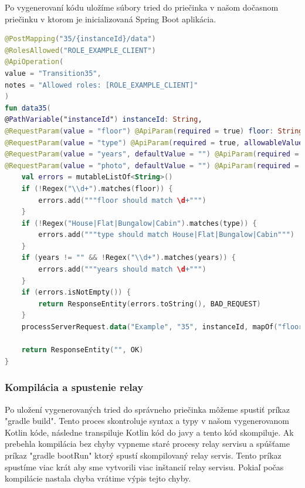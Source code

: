 Po vygenerovaní kódu uložíme súbory tried do priečinka v našom dočasnom priečinku v ktorom je inicializovaná Spring Boot aplikácia.   



\begin{lstlisting}[float, caption={Príklad vygenerovanej funkcie},label={alg:generated_endpoint},language=Kotlin] 
@PostMapping("35/{instanceId}/data") 
@RolesAllowed("ROLE_EXAMPLE_CLIENT") 
@ApiOperation( 
value = "Transition35", 
notes = "Allowed roles: [ROLE_EXAMPLE_CLIENT]" 
) 
fun data35( 
@PathVariable("instanceId") instanceId: String, 
@RequestParam(value = "floor") @ApiParam(required = true) floor: String, 
@RequestParam(value = "type") @ApiParam(required = true, allowableValues = """[House, Flat, Bungalow, Cabin]""") type: String, 
@RequestParam(value = "years", defaultValue = "") @ApiParam(required = false) years: String, 
@RequestParam(value = "photo", defaultValue = "") @ApiParam(required = false) photo: MultipartFile ): ResponseEntity<String> { 
	val errors = mutableListOf<String>() 
	if (!Regex("\\d+").matches(floor)) { 
		errors.add("""floor should match \d+""") 
	} 
	if (!Regex("House|Flat|Bungalow|Cabin").matches(type)) { 
		errors.add("""type should match House|Flat|Bungalow|Cabin""") 
	}
	if (years != "" && !Regex("\\d+").matches(years)) { 
		errors.add("""years should match \d+""") 
	} 
	if (errors.isNotEmpty()) { 
		return ResponseEntity(errors.toString(), BAD_REQUEST) 
	} 
	processServerRequest.data("Example", "35", instanceId, mapOf("floor" to floor, "type" to type, "years" to years, "photo" to photo )) 
	
	return ResponseEntity("", OK) 
} 
\end{lstlisting} 



\subsubsection{Kompilácia a spustenie relay} 

Po uložení vygenerovaných tried do správneho priečinka môžeme spustiť príkaz "gradle build". Tento proces skontroluje syntax a typy v našom vygenerovanom Kotlin kóde, následne transpiluje Kotlin kód do javy a tento kód skompiluje. Ak prebehla kompilácia bez chyby vypneme staré procesy relay servisu a spúšťame príkaz "gradle bootRun" ktorý spustí skompilovaný relay servis. Tento príkaz spustíme viac krát aby sme vytvorili viac inštancií relay servisu. Pokiaľ počas kompilácie nastala chyba vrátime výpis tejto chyby.  





